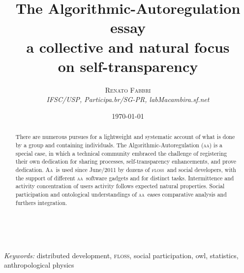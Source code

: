 \documentclass[a4paper, 11pt]{article} %
\title{\textbf{The Algorithmic-Autoregulation essay}\\ %
a collective and natural focus\\ on self-transparency} %
\author{\textsc{Renato Fabbri} %
\\{\textit{IFSC/USP, Participa.br/SG-PR, labMacambira.sf.net}}} %
\date{\today} %
\makeatletter
\newcommand{\floss}{\textsc{floss}}
\newcommand{\aab}{\textsc{aa}}
\newcommand{\aai}{\textsc{Aa}}
\newcommand{\owl}{{\sc owl}}
\renewcommand{\maketitle}{ %
\begin{flushright} %
{\LARGE\@title} %

\vspace{50pt} %

{\large\@author} %
\\\@date %

\vspace{40pt} %
\end{flushright}
}
\makeatother
\begin{document}
\maketitle %




\begin{abstract}
    There are numerous pursues for a lightweight and systematic account of what is done by a group and containing individuals. The Algorithmic-Autoregulation (\aab) is a special case, in which a technical community embraced the challenge of registering their own dedication for sharing processes, self-transparency enhancements, and prove dedication. \aai\ is used since June/2011 by dozens of \floss\ and social developers, with the support of different \aab\ software gadgets and for distinct tasks. Intermittence and activity concentration of users activity follows expected natural properties. Social participation and ontological understandings of \aab\ eases comparative analysis and furthers integration.
\end{abstract}

{
\begin{abstract}

\end{abstract}
}

\hspace*{3,6mm}\textit{Keywords:} distributed development, \floss, social participation, \owl, statistics, anthropological physics %


\newpage
\tableofcontents
\end{document}

